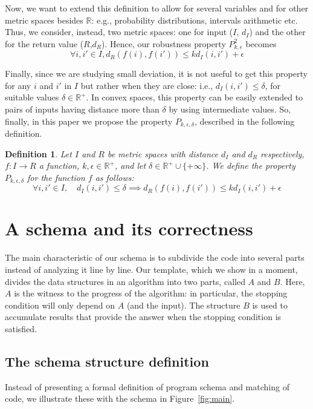 \documentclass[copyright,creativecommons]{eptcs}
\newtheorem{definition}{Definition}[section]
\newcommand{\R}{\mathbb{R}}
\begin{document}
Now, we want to extend this definition to allow for several variables
and for other metric spaces besides $\R$: e.g., probability
distributions, intervals arithmetic etc.  Thus, we consider, instead,
two metric spaces: one for input ($I$, $d_I$) and the other for the
return value ($R$,$d_R$).  Hence, our robustness property
$P^2_{k,\epsilon}$ becomes
\[\forall i,i' \in I, d_R(f(i),f(i')) \leq k d_I(i,i') + \epsilon \]

Finally, since we are studying small deviation, it is not useful to
get this property for any $i$ and $i'$ in $I$ but rather when they are
close: i.e., $d_I(i,i')\le \delta$, for suitable values $\delta\in\R^+$.
In convex spaces, this property can be easily extended to  
pairs of inputs  having distance more than $\delta$ by using intermediate
values.  So, finally, in this paper we propose the property $P_{k,\epsilon,\delta}$, 
described in the following definition.

\begin{definition}\label{def:k-epsilon-delta}
Let $I$ and $R$ be metric spaces with distance $d_I$ and $d_R$
respectively, $f : I \to R$ a function, $k,\epsilon\in\R^+$, and let
$\delta\in\R^+\cup\{+\infty\}$.  We define the
property $P_{k,\epsilon,\delta}$ for the function $f$ as follows: 
\[\forall i,i' \in I,\quad d_I(i,i') \leq \delta\implies 
                           d_R(f(i),f(i')) \leq k d_I(i,i') + \epsilon \]
\end{definition}




\section{A schema and its correctness}\label{sec:control}
The main characteristic  of our schema is to subdivide the code into
several parts instead of analyzing it line by line. 
Our template, which we show in a moment, divides the data structures
in an algorithm into two parts, called $A$ and $B$.  Here, $A$ is the
witness to the progress of the algorithm: in particular, the stopping
condition will only depend on $A$ (and the input).   The structure $B$
is used to accumulate results that provide the answer when the
stopping condition is satisfied.

\subsection{The schema structure definition}\label{sec:schema}
Instead of
presenting a formal definition of program schema and matching of
code, we illustrate these with the schema in Figure~\ref{fig:main}.  
\end{document}
